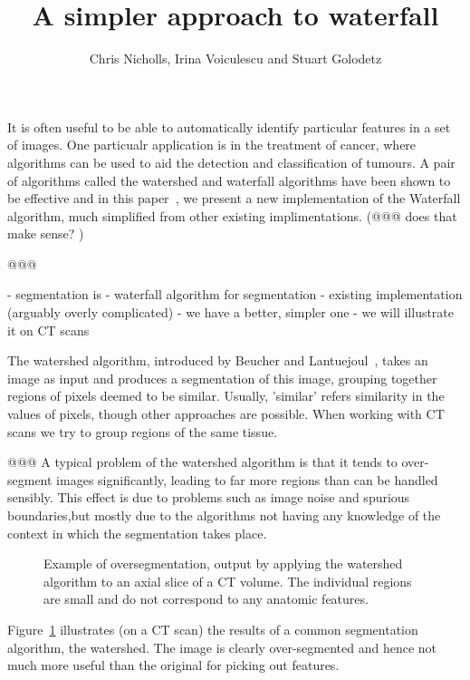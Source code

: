 \documentclass{ouclprgsc}
\title{\LARGE \bf
A simpler approach to waterfall
}
\author{Chris Nicholls, Irina Voiculescu and Stuart Golodetz
}
\institute{Oxford University Computing Laboratory}
\begin{document}
\maketitle
\pagestyle{empty}

It is often useful to be able to automatically identify particular
features in a set of images. One particualr application is in
the treatment of cancer, where algorithms can be used to aid the
detection and classification of tumours. A pair of algorithms
called the watershed and waterfall algorithms have been shown
to be effective and in this paper~\cite{golodetz}, we present a new implementation
of the Waterfall algorithm, much simplified from other existing
implimentations.  (@@@ does that make sense? )


@@@

 - segmentation is
 - waterfall algorithm for segmentation
 - existing implementation (arguably overly complicated)
 - we have a better, simpler one
 - we will illustrate it on CT scans


The watershed algorithm, introduced by Beucher and
Lantuejoul~\cite{beucher79}, takes an image as input and produces a segmentation of this image, grouping together regions of pixels deemed to be similar.
Usually, 'similar' refers similarity in the values of pixels, though other approaches are possible.
When working with CT scans we try to group regions of the same tissue.


@@@ A typical problem of the watershed algorithm is that it tends to
over-segment images significantly, leading to far more regions than
can be handled sensibly. This effect is due to problems such as image
noise and spurious boundaries,but mostly due to the algorithms not
having any knowledge of the context in which the segmentation takes place.


\begin{figure}
\centering
\ifpdf
        \hspace{1mm}%
\else
\fi
\caption{Example of oversegmentation, output by applying the watershed
  algorithm to an axial slice of a CT volume. The individual regions
  are small and do not correspond to any anatomic features.}
\label{fig:oversegmented}
\end{figure}

Figure~\ref{fig:oversegmented} illustrates (on a CT scan) the results
of a common segmentation algorithm, the watershed. The image is
clearly over-segmented and hence not much more useful than the
original for picking out features.
\end{document}
